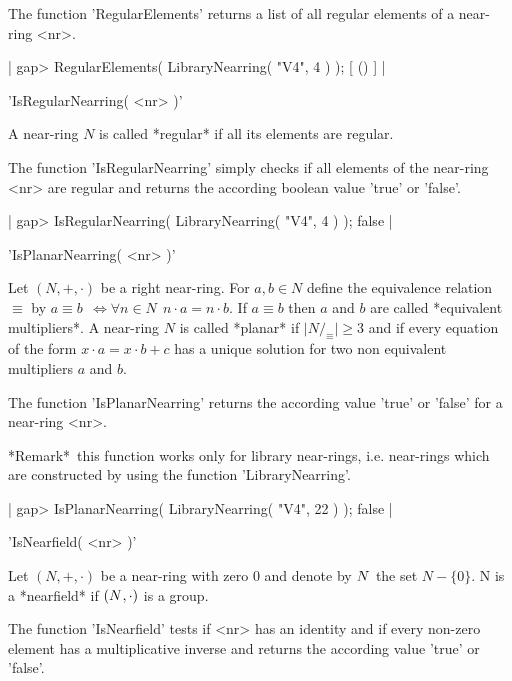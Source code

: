 The function 'RegularElements' returns a list of all 
regular elements of a near-ring <nr>.

|  gap> RegularElements( LibraryNearring( "V4", 4 ) );       
  [ () ]
|

   
'IsRegularNearring( <nr> )'  

A near-ring $N$ is called *regular* if all its elements are regular.

The function 'IsRegularNearring' simply checks if all elements
of the near-ring <nr> are regular and returns the according 
boolean value 'true' or 'false'.

|  gap> IsRegularNearring( LibraryNearring( "V4", 4 ) );
  false
|

   
'IsPlanarNearring( <nr> )'  

Let $(N,+,\cdot)$ be a right near-ring. For $a,b \in N$ define the 
equivalence relation $\equiv$ by $a \equiv b\:\ \Leftrightarrow
\forall n \in N\:\ n\cdot a = n\cdot b$. If $a \equiv b$ then $a$ and $b$
are called *equivalent multipliers*.
A near-ring $N$ is called *planar* if 
$\mid N/_{\equiv} \mid \ge 3$ and if every equation of the form
$x\cdot a = x\cdot b + c$ has a unique solution for two non equivalent
multipliers $a$ and $b$.

The function 'IsPlanarNearring' returns 
the according value 'true' or 'false' for a near-ring <nr>.

*Remark\:*\
this function works only for library near-rings, i.e. near-rings which are
constructed by using the function 'LibraryNearring'.

|  gap> IsPlanarNearring( LibraryNearring( "V4", 22 ) );
  false
|

\Section{IsNearfield}
   
'IsNearfield( <nr> )'  

Let $(N,+,\cdot)$ be a near-ring with zero $0$ and denote by $N^{\*}$ 
the set $N - \{0\}$. N is a *nearfield* if
$(N^{\*},\cdot)$ is a group.

The function 'IsNearfield' tests if <nr> has an identity and 
if every non-zero element has a multiplicative inverse and returns
the according value 'true' or 'false'.

